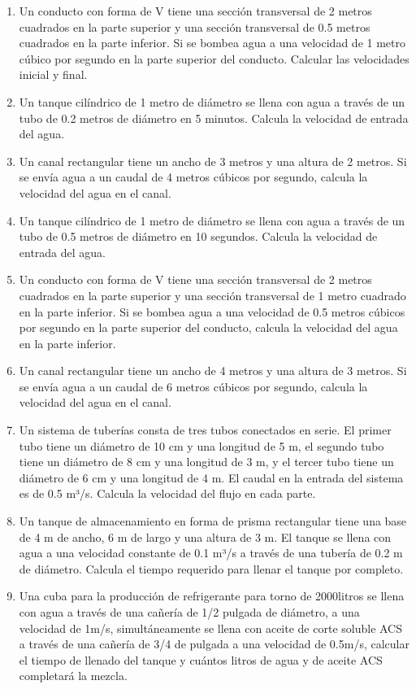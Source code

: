 \documentclass[../main]{subfiles}
\begin{document}
\begin{enumerate}
  \item Un conducto con forma de V tiene una sección transversal de
    2 metros cuadrados en la parte superior y una sección
    transversal de 0.5 metros cuadrados en la parte inferior. Si se
    bombea agua a una velocidad de 1 metro cúbico por segundo en la
    parte superior del conducto. Calcular las velocidades inicial y final.

  \item Un tanque cilíndrico de 1 metro de diámetro se llena con
    agua a través de un tubo de 0.2 metros de diámetro en 5
    minutos. Calcula la velocidad de entrada del agua.

  \item Un canal rectangular tiene un ancho de 3 metros y una
    altura de 2 metros. Si se envía agua a un caudal de 4 metros
    cúbicos por segundo, calcula la velocidad del agua en el canal.

  \item Un tanque cilíndrico de 1 metro de diámetro se llena con
    agua a través de un tubo de 0.5 metros de diámetro en 10
    segundos. Calcula la velocidad de entrada del agua.

  \item Un conducto con forma de V tiene una sección transversal de
    2 metros cuadrados en la parte superior y una sección
    transversal de 1 metro cuadrado en la parte inferior. Si se
    bombea agua a una velocidad de 0.5 metros cúbicos por segundo
    en la parte superior del conducto, calcula la velocidad del
    agua en la parte inferior.

  \item Un canal rectangular tiene un ancho de 4 metros y una
    altura de 3 metros. Si se envía agua a un caudal de 6 metros
    cúbicos por segundo, calcula la velocidad del agua en el canal.

  \item Un sistema de tuberías consta de tres tubos conectados en
    serie. El primer tubo tiene un diámetro de 10 cm y una longitud
    de 5 m, el segundo tubo tiene un diámetro de 8 cm y una
    longitud de 3 m, y el tercer tubo tiene un diámetro de 6 cm y
    una longitud de 4 m. El caudal en la entrada del sistema es de
    0.5 m³/s. Calcula la velocidad del flujo en cada parte.

  \item Un tanque de almacenamiento en forma de prisma rectangular
    tiene una base de 4 m de ancho, 6 m de largo y una altura de 3
    m. El tanque se llena con agua a una velocidad constante de 0.1
    m³/s a través de una tubería de 0.2 m de diámetro. Calcula el
    tiempo requerido para llenar el tanque por completo.

  \item Una cuba para la producción de refrigerante para torno de
    2000litros se llena con agua a través de una cañería de 1/2
    pulgada de diámetro, a una velocidad de 1m/s, simultáneamente
    se llena con aceite de corte soluble ACS a través de una
    cañería de 3/4 de pulgada a una velocidad de 0.5m/s, calcular
    el tiempo de llenado del tanque y cuántos litros de agua y de
    aceite ACS completará la mezcla.
\end{enumerate}
\end{document}
